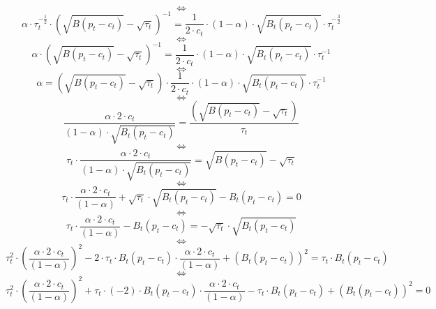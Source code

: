 \documentclass{article}
\begin{document}
$$\iff$$
\begin{equation*}
    \alpha\cdot \tau_{t}^{-\frac{1}{2}}\cdot \left(\sqrt{B(p_{t}-c_{t})}-\sqrt{\tau_{t}}\right)^{-1} = \frac{1}{2\cdot c_{t}}\cdot (1-\alpha)\cdot\sqrt{B_{t}(p_{t}-c_{t})}\cdot\tau_{t}^{-\frac{3}{2}} 
\end{equation*}
$$\iff$$
\begin{equation*}
    \alpha\cdot \left(\sqrt{B(p_{t}-c_{t})}-\sqrt{\tau_{t}}\right)^{-1} = \frac{1}{2\cdot c_{t}}\cdot (1-\alpha)\cdot\sqrt{B_{t}(p_{t}-c_{t})}\cdot\tau_{t}^{-1} 
\end{equation*}
$$\iff$$
\begin{equation*}
    \alpha = \left(\sqrt{B(p_{t}-c_{t})}-\sqrt{\tau_{t}}\right)\cdot \frac{1}{2\cdot c_{t}}\cdot (1-\alpha)\cdot\sqrt{B_{t}(p_{t}-c_{t})}\cdot\tau_{t}^{-1} 
\end{equation*}
$$\iff$$
\begin{equation*}
    \frac{\alpha \cdot 2\cdot c_{t}}{(1-\alpha)\cdot\sqrt{B_{t}(p_{t}-c_{t})}}= \frac{\left(\sqrt{B(p_{t}-c_{t})}-\sqrt{\tau_{t}}\right)}{\tau_{t}} 
\end{equation*}
$$\iff$$
\begin{equation*}
    \tau_{t}\cdot\frac{\alpha \cdot 2\cdot c_{t}}{(1-\alpha)\cdot\sqrt{B_{t}(p_{t}-c_{t})}}= \sqrt{B(p_{t}-c_{t})}-\sqrt{\tau_{t}} 
\end{equation*}
$$\iff$$
\begin{equation*}
    \tau_{t}\cdot\frac{\alpha \cdot 2\cdot c_{t}}{(1-\alpha)}+\sqrt{\tau_{t}}\cdot\sqrt{B_{t}(p_{t}-c_{t})}-B_{t}(p_{t}-c_{t})=0
\end{equation*}
$$\iff$$
\begin{equation*}
    \tau_{t}\cdot\frac{\alpha \cdot 2\cdot c_{t}}{(1-\alpha)}-B_{t}(p_{t}-c_{t})=-\sqrt{\tau_{t}}\cdot\sqrt{B_{t}(p_{t}-c_{t})}
\end{equation*}
$$\iff$$
\begin{equation*}
    \tau_{t}^{2}\cdot\left(\frac{\alpha \cdot 2\cdot c_{t}}{(1-\alpha)}\right)^{2}-2\cdot\tau_{t}\cdot B_{t}\left(p_{t}-c_{t}\right)\cdot \frac{\alpha \cdot 2\cdot c_{t}}{(1-\alpha)}+\left(B_{t}(p_{t}-c_{t})\right)^{2}={\tau_{t}}\cdot{B_{t}(p_{t}-c_{t})}
\end{equation*}
$$\iff$$
\begin{equation*}
    \tau_{t}^{2}\cdot\left(\frac{\alpha \cdot 2\cdot c_{t}}{(1-\alpha)}\right)^{2}+\tau_{t}\cdot(-2)\cdot B_{t}\left(p_{t}-c_{t}\right)\cdot \frac{\alpha \cdot 2\cdot c_{t}}{(1-\alpha)}-{\tau_{t}}\cdot{B_{t}(p_{t}-c_{t})}+\left(B_{t}(p_{t}-c_{t})\right)^{2}=0
\end{equation*}
\end{document}
